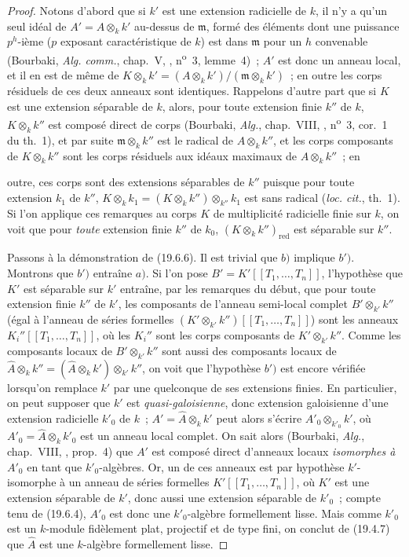 \begin{proof}
Notons d'abord que si $k'$ est une extension radicielle de $k$, il n'y a qu'un
seul idéal de $A'=A\otimes_k k'$ au-dessus de $\mathfrak m$, formé des éléments
dont une puissance $p^h$-ième ($p$ exposant caractéristique de $k$) est dans
$\mathfrak m$ pour un $h$ convenable (Bourbaki, \emph{Alg. comm.}, chap.~V,
, n\textsuperscript{o}~3, lemme~4)~; $A'$ est donc un anneau
local, et il en est de même de
$K\otimes_k k'=(A\otimes_k k')/(\mathfrak m\otimes_k k')$~; en outre les corps
résiduels de ces deux anneaux sont identiques. Rappelons d'autre part que si
$K$ est une extension séparable de $k$, alors, pour toute extension finie
$k''$ de $k$, $K\otimes_k k''$ est composé direct de corps (Bourbaki,
\emph{Alg.}, chap.~VIII, , n\textsuperscript{o}~3, cor.~1 du
th.~1), et par suite $\mathfrak m\otimes_k k''$ est le radical de
$A\otimes_k k''$, et les corps composants de $K\otimes_k k''$ sont les corps
résiduels aux idéaux maximaux de $A\otimes_k k''$~; en


outre, ces corps sont des extensions séparables de $k''$ puisque pour toute
extension $k_1$ de $k''$,
$K\otimes_k k_1=(K\otimes_k k'')\otimes_{k''}k_1$ est sans radical
(\emph{loc. cit.}, th.~1). Si l'on applique ces remarques au corps $K$ de
multiplicité radicielle finie sur $k$, on voit que pour \emph{toute} extension
finie $k''$ de $k_0$, $(K\otimes_k k'')_{\mathrm{red}}$ est séparable sur
$k''$.

Passons à la démonstration de (19.6.6). Il est trivial que $b)$ implique
$b')$. Montrons que $b')$ entraîne $a)$. Si l'on pose
$B'=K'[[T_1,\ldots,T_n]]$, l'hypothèse que $K'$ est séparable sur $k'$
entraîne, par les remarques du début, que pour toute extension finie $k''$ de
$k'$, les composants de l'anneau semi-local complet $B'\otimes_{k'}k''$
(égal à l'anneau de séries formelles
$(K'\otimes_{k'}k'')[[T_1,\ldots,T_n]]$) sont les anneaux
$K_i''[[T_1,\ldots,T_n]]$, où les $K_i''$ sont les corps composants de
$K'\otimes_{k'}k''$. Comme les composants locaux de $B'\otimes_{k'}k''$ sont
aussi des composants locaux de
$\widehat A\otimes_k k''=(\widehat A\otimes_k k')\otimes_{k'}k''$,
on voit que l'hypothèse $b')$ est encore vérifiée lorsqu'on remplace $k'$ par
une quelconque de ses extensions finies. En particulier, on peut supposer que
$k'$ est \emph{quasi-galoisienne}, donc extension galoisienne d'une extension
radicielle $k'_0$ de $k$~; $A'=\widehat A\otimes_k k'$ peut alors s'écrire
$A'_0\otimes_{k'_0}k'$, où $A'_0=\widehat A\otimes_k k'_0$ est un anneau
local complet. On sait alors (Bourbaki, \emph{Alg.}, chap.~VIII,
, prop.~4) que $A'$ est composé direct d'anneaux locaux
\emph{isomorphes à} $A'_0$ en tant que $k'_0$-algèbres. Or, un de ces anneaux
est par hypothèse $k'$-isomorphe à un anneau de séries formelles
$K'[[T_1,\ldots,T_n]]$, où $K'$ est une extension séparable de $k'$, donc
aussi une extension séparable de $k'_0$~; compte tenu de (19.6.4),
$A'_0$ est donc une $k'_0$-algèbre formellement lisse. Mais comme $k'_0$ est
un $k$-module fidèlement plat, projectif et de type fini, on conclut de
(19.4.7) que $\widehat A$ est une $k$-algèbre formellement lisse.


\end{proof}
